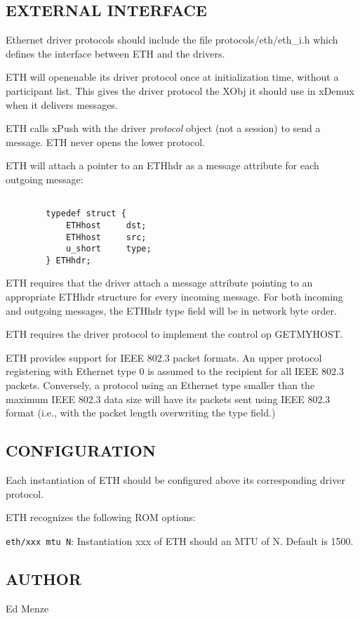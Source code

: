 \subsection*{EXTERNAL INTERFACE}

Ethernet driver protocols should include the file 
{\sanss protocols/eth/eth\_i.h} which defines the interface between ETH
and the drivers.

ETH will openenable its driver protocol once at initialization time,
without a participant list.  This gives the driver protocol
the XObj it should use in xDemux when it delivers messages.

ETH calls xPush with the driver {\em protocol} object (not a session)
to send a message.  ETH never opens the lower protocol.

ETH will attach a pointer to an ETHhdr as a message attribute for each
outgoing message:

\begin{verbatim}

        typedef struct {
            ETHhost     dst;
            ETHhost     src;
            u_short     type;
        } ETHhdr;

\end{verbatim}

ETH requires that the driver attach a message attribute pointing to an
appropriate ETHhdr structure for every incoming message.  For both
incoming and outgoing messages, the ETHhdr type field will be in 
network byte order.

ETH requires the driver protocol to implement the control op GETMYHOST.

ETH provides support for IEEE 802.3 packet formats.  An upper protocol
registering with Ethernet type 0 is assumed to the recipient for all
IEEE 802.3 packets.  Conversely, a protocol using an Ethernet type
smaller than the maximum IEEE 802.3 data size will have its packets
sent using IEEE 802.3 format (i.e., with the packet length overwriting
the type field.)


\subsection*{CONFIGURATION}

Each instantiation of ETH should be configured above its corresponding
driver protocol.

\bigskip

\noindent
ETH recognizes the following ROM options:

\smallskip

{\tt eth/xxx mtu N}:
Instantiation xxx of ETH should an MTU of N.  Default is 1500.


\subsection*{AUTHOR}

Ed Menze
